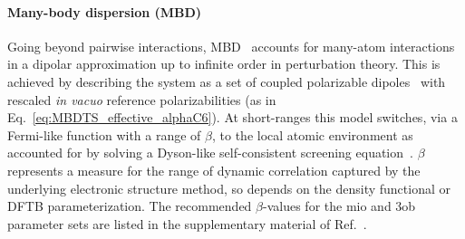 \documentclass[reprint,onecolumn,superscriptaddress]{revtex4-1}
\begin{document}
\paragraph{Many-body dispersion (MBD)}
Going beyond pairwise interactions, MBD~\cite{Tkatchenko2012,Ambrosetti2014}
accounts for many-atom interactions in a dipolar approximation up to infinite
order in perturbation theory. This is achieved by describing the system as a set
of coupled polarizable dipoles~\cite{Tkatchenko2012} with rescaled \textit{in
  vacuo} reference polarizabilities (as in
Eq.~\eqref{eq:MBDTS_effective_alphaC6}). At short-ranges this model switches,
via a Fermi-like function with a range of $\beta$, to the local atomic
environment as accounted for by solving a Dyson-like self-consistent screening
equation~\cite{Ambrosetti2014}. $\beta$ represents a measure for the range of
dynamic correlation captured by the underlying electronic structure method, so
depends on the density functional or DFTB parameterization. The recommended
$\beta$-values for the mio and 3ob parameter sets are listed in the
supplementary material of Ref.~\cite{hourahine-JCP-152-124101}.
\end{document}
